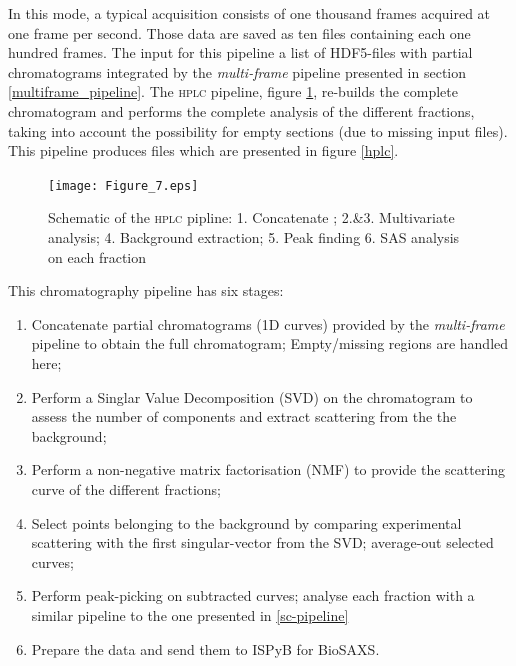 \documentclass[preprint]{iucr}              %
\begin{document}
In this mode, a typical acquisition consists of one thousand frames acquired at one frame per second.
Those data are saved as ten files containing each one hundred frames.
The input for this pipeline a list of HDF5-files with partial chromatograms integrated by the \textit{multi-frame} pipeline presented in section \ref{multiframe_pipeline}. 
The \textsc{hplc} pipeline, figure \ref{hplc_worflow}, re-builds the complete chromatogram and performs the complete analysis of the different fractions, taking into account the possibility for empty sections (due to missing input files).
This pipeline produces files which are presented in figure \ref{hplc}.
\begin{figure}
\label{hplc_worflow}
\texttt{[image: Figure\_7.eps]}
\caption{Schematic of the \textsc{hplc} pipline: 
1. Concatenate ;
2.\&3. Multivariate analysis;
4. Background extraction;
5. Peak finding
6. SAS analysis on each fraction}
\end{figure}

This chromatography pipeline has six stages:
\begin{enumerate}
    \item Concatenate partial chromatograms (1D curves) provided by the \textit{multi-frame} pipeline to obtain the full chromatogram; Empty/missing regions are handled here;
    \item Perform a Singlar Value Decomposition (SVD) on the chromatogram to assess the number of components and extract scattering from the the background; 
    \item Perform a non-negative matrix factorisation (NMF) to provide the scattering curve of the different fractions; 
    \item Select points belonging to the background by comparing experimental scattering with the first singular-vector from the SVD; average-out selected curves; %
    \item Perform peak-picking on subtracted curves; analyse each fraction with a similar pipeline to the one presented in \ref{sc-pipeline} %
    \item Prepare the data and send them to ISPyB for BioSAXS.
\end{enumerate}
\end{document}
